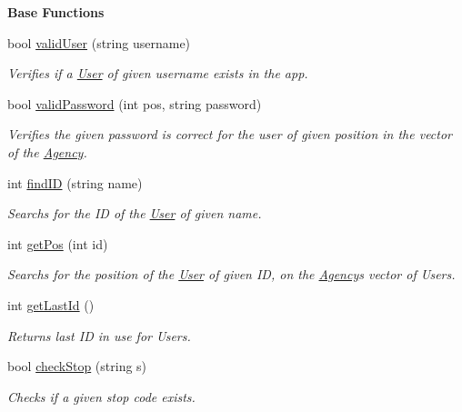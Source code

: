 \begin{Indent}\textbf{ Base Functions}\par
\begin{DoxyCompactItemize}
\item 
bool \hyperlink{group___agency_ga633274c6bc861317f03bf378e5286312}{valid\+User} (string username)
\begin{DoxyCompactList}\small\item\em Verifies if a \hyperlink{class_user}{User} of given username exists in the app. \end{DoxyCompactList}\item 
bool \hyperlink{group___agency_ga12c6a13fdeaaa5a2adab736313b3d180}{valid\+Password} (int pos, string password)
\begin{DoxyCompactList}\small\item\em Verifies the given password is correct for the user of given position in the vector of the \hyperlink{class_agency}{Agency}. \end{DoxyCompactList}\item 
int \hyperlink{group___agency_gab129c30ae0ba6c735d0f600c1b00894d}{find\+ID} (string name)
\begin{DoxyCompactList}\small\item\em Searchs for the ID of the \hyperlink{class_user}{User} of given name. \end{DoxyCompactList}\item 
int \hyperlink{group___agency_ga7ec884913bb5c9803cc5b71dc4a569d3}{get\+Pos} (int id)
\begin{DoxyCompactList}\small\item\em Searchs for the position of the \hyperlink{class_user}{User} of given ID, on the \hyperlink{class_agency}{Agency}\textquotesingle{}s vector of Users. \end{DoxyCompactList}\item 
int \hyperlink{group___agency_ga4f91eb604ad3eb3ea8142b8ab65b968d}{get\+Last\+Id} ()
\begin{DoxyCompactList}\small\item\em Returns last ID in use for Users. \end{DoxyCompactList}\item 
bool \hyperlink{group___agency_ga5de11a6e7a081abefea2560290d542b6}{check\+Stop} (string s)
\begin{DoxyCompactList}\small\item\em Checks if a given stop code exists. \end{DoxyCompactList}\item 

\end{DoxyCompactItemize}
\end{Indent}
